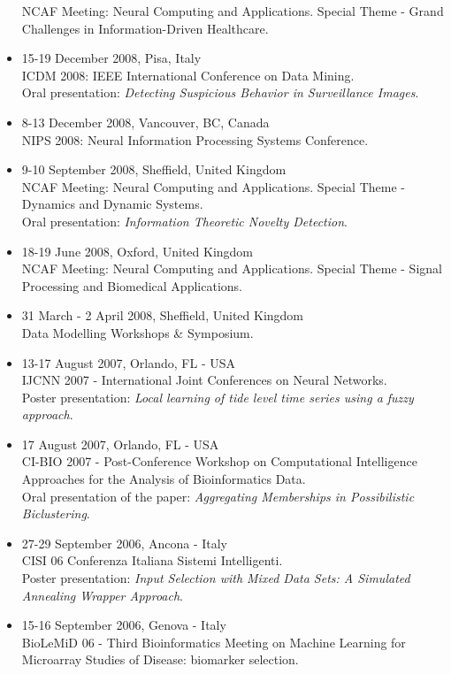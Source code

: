 \documentclass[a4paper,10pt]{article}
\begin{document}
\begin{itemize}
  NCAF Meeting: Neural Computing and Applications. Special Theme - Grand Challenges in Information-Driven Healthcare.
\item 15-19 December 2008, Pisa, Italy \\
  ICDM 2008: IEEE International Conference on Data Mining.
  \\Oral presentation: \emph{Detecting Suspicious Behavior in Surveillance Images}.
\item 8-13 December 2008, Vancouver, BC, Canada \\
  NIPS 2008: Neural Information Processing Systems Conference.
\item 9-10 September 2008, Sheffield, United Kingdom \\
  NCAF Meeting: Neural Computing and Applications. Special Theme - Dynamics and Dynamic Systems.
  \\Oral presentation: \emph{Information Theoretic Novelty Detection}.
\item 18-19 June 2008, Oxford, United Kingdom \\
  NCAF Meeting: Neural Computing and Applications. Special Theme - Signal Processing and Biomedical Applications.
\item 31 March - 2 April 2008, Sheffield, United Kingdom \\
  Data Modelling Workshops \& Symposium.
\item 13-17 August 2007, Orlando, FL - USA \\
  IJCNN 2007 - International Joint Conferences on Neural Networks.
  \\Poster presentation: \emph{Local learning of tide level time series using a fuzzy approach}.
\item 17 August 2007, Orlando, FL - USA \\
  CI-BIO 2007 - Post-Conference Workshop on Computational Intelligence Approaches for the Analysis of Bioinformatics Data.
  \\Oral presentation of the paper: \emph{Aggregating Memberships in Possibilistic Biclustering}.
\item 27-29 September 2006, Ancona - Italy \\
  CISI 06 Conferenza Italiana Sistemi Intelligenti.
  \\Poster presentation: \emph{Input Selection with Mixed Data Sets: A Simulated Annealing Wrapper Approach}.
\item 15-16 September 2006, Genova - Italy \\
  BioLeMiD 06 - Third Bioinformatics Meeting on Machine Learning for Microarray Studies of Disease: biomarker selection.

\end{itemize}
\end{document}
